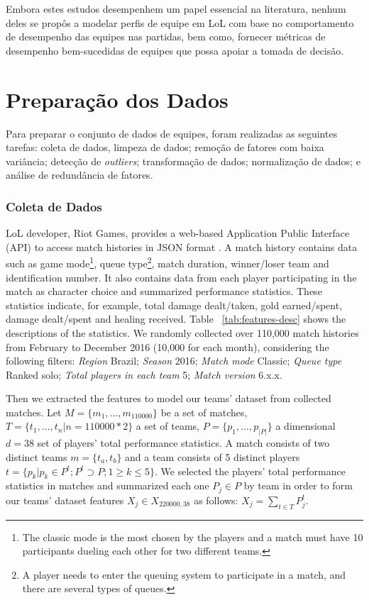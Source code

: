 Embora estes estudos desempenhem um papel essencial na literatura, nenhum deles se propôs a modelar perfis de equipe em LoL com base no comportamento de desempenho das equipes nas partidas, bem como, fornecer métricas de desempenho bem-sucedidas de equipes que possa apoiar a tomada de decisão.

\chapter{Preparação dos Dados}
Para preparar o conjunto de dados de equipes, foram realizadas as seguintes tarefas: coleta de dados, limpeza de dados; remoção de fatores com baixa variância; detecção de \textit{outliers}; transformação de dados; normalização de dados; e análise de redundância de fatores.

\subsection{Coleta de Dados}
LoL developer, Riot Games, provides a web-based Application Public Interface (API) to access match histories in JSON format \cite{riot1}. A match history contains data such as game mode\footnote{The classic mode is the most chosen by the players and a match must have 10 participants dueling each other for two different teams.}, queue type\footnote{A player needs to enter the queuing system to participate in a match, and there are several types of queues.}, match duration, winner/loser team and identification number. It also contains data from each player participating in the match as character choice and summarized performance statistics. These statistics indicate, for example, total damage dealt/taken, gold earned/spent, damage dealt/spent and healing received. Table ~\ref{tab:features-desc} shows the descriptions of the statistics. We randomly collected over 110,000 match histories from February to December 2016 (10,000 for each month), considering the following filters: \textit{Region} Brazil; \textit{Season} 2016; \textit{Match mode} Classic; \textit{Queue type} Ranked solo; \textit{Total players in each team} 5; \textit{Match version} 6.x.x.

Then we extracted the features to model our teams' dataset from collected matches. Let $M=\{m_1,...,m_{110000}\}$ be a set of matches, $T=\{t_1, ..., t_n | n=110000 * 2\}$ a set of teams, $P=\{p_1, ..., p_{|P|}\}$ a dimensional $d=38$ set of players' total performance statistics. A match consists of two distinct teams $m=\{t_a,t_b\}$ and a team consists of 5 distinct players $t=\{p_k |  p_k \in P^t; P^t \supset P; 1 \geq k \leq 5\}$. We selected the players' total performance statistics in matches and summarized each one $P_j \in P$ by team in order to form our teams' dataset features $X_j \in X_{220000, 38}$ as follows: $X_j= \sum_{t \in T}{} P_{j}^{t}$.

